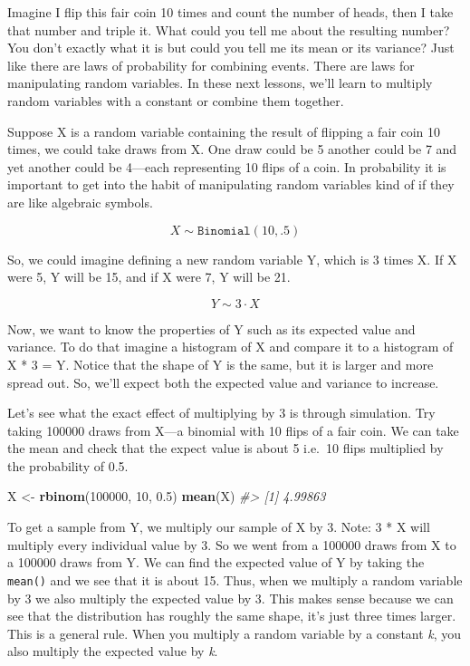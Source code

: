 \documentclass[]{article}
\newenvironment{Shaded}{\begin{snugshade}}{\end{snugshade}}
\newcommand{\CommentTok}[1]{\textcolor[rgb]{0.56,0.35,0.01}{\textit{#1}}}
\newcommand{\DecValTok}[1]{\textcolor[rgb]{0.00,0.00,0.81}{#1}}
\newcommand{\FloatTok}[1]{\textcolor[rgb]{0.00,0.00,0.81}{#1}}
\newcommand{\KeywordTok}[1]{\textcolor[rgb]{0.13,0.29,0.53}{\textbf{#1}}}
\newcommand{\NormalTok}[1]{#1}
\newcommand{\StringTok}[1]{\textcolor[rgb]{0.31,0.60,0.02}{#1}}
\begin{document}
Imagine I flip this fair coin 10 times and count the number of heads,
then I take that number and triple it. What could you tell me about the
resulting number? You don't exactly what it is but could you tell me its
mean or its variance? Just like there are laws of probability for
combining events. There are laws for manipulating random variables. In
these next lessons, we'll learn to multiply random variables with a
constant or combine them together.

Suppose X is a random variable containing the result of flipping a fair
coin 10 times, we could take draws from X. One draw could be 5 another
could be 7 and yet another could be 4---each representing 10 flips of a
coin. In probability it is important to get into the habit of
manipulating random variables kind of if they are like algebraic
symbols.

\[X \sim \texttt{Binomial}(10, .5)\]

So, we could imagine defining a new random variable Y, which is 3 times
X. If X were 5, Y will be 15, and if X were 7, Y will be 21.

\[ Y \sim 3 \cdot X\]

Now, we want to know the properties of Y such as its expected value and
variance. To do that imagine a histogram of X and compare it to a
histogram of X * 3 = Y. Notice that the shape of Y is the same, but it
is larger and more spread out. So, we'll expect both the expected value
and variance to increase.

Let's see what the exact effect of multiplying by 3 is through
simulation. Try taking 100000 draws from X---a binomial with 10 flips of
a fair coin. We can take the mean and check that the expect value is
about 5 i.e.~10 flips multiplied by the probability of 0.5.

\begin{Shaded}
\begin{Highlighting}[]
\NormalTok{X <-}\StringTok{ }\KeywordTok{rbinom}\NormalTok{(}\DecValTok{100000}\NormalTok{, }\DecValTok{10}\NormalTok{, }\FloatTok{0.5}\NormalTok{)}
\KeywordTok{mean}\NormalTok{(X)}
\CommentTok{#> [1] 4.99863}
\end{Highlighting}
\end{Shaded}

To get a sample from Y, we multiply our sample of X by 3. Note: 3 * X
will multiply every individual value by 3. So we went from a 100000
draws from X to a 100000 draws from Y. We can find the expected value of
Y by taking the \texttt{mean()} and we see that it is about 15. Thus,
when we multiply a random variable by 3 we also multiply the expected
value by 3. This makes sense because we can see that the distribution
has roughly the same shape, it's just three times larger. This is a
general rule. When you multiply a random variable by a constant
\emph{k}, you also multiply the expected value by \emph{k}.
\end{document}
